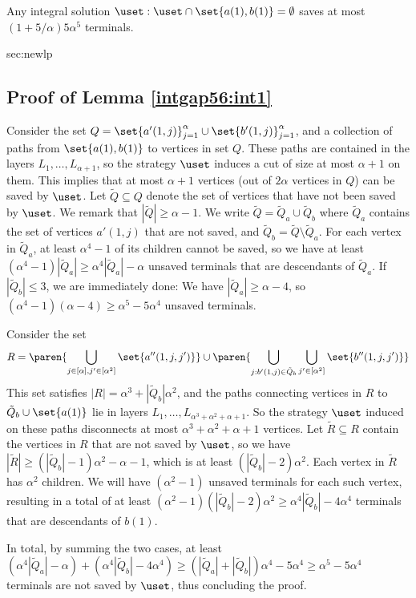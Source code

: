 \begin{lemma} 
Any integral solution $\uset: \uset \cap \set{a(1), b(1)} =\emptyset$ saves at most $(1+5/\alpha) 5 \alpha^5$ terminals.
\label{intgap56:int1}
\end{lemma} 
\begin{appendixproof}{sec:newlp}{\subsection{Proof of Lemma \ref{intgap56:int1}}}
Consider the set $Q= \set{a'(1,j)}_{j=1}^{\alpha} \cup \set{b'(1,j)}_{j=1}^{\alpha}$, and a collection of paths from $\set{a(1),b(1)}$ to vertices in set $Q$.  
These paths are contained in the layers $L_1, \ldots, L_{\alpha+1}$, so the strategy $\uset$ induces a cut of size at most $\alpha+1$ on them. 
This implies that at most $\alpha+1$ vertices (out of $2\alpha$ vertices in $Q$) can be saved by $\uset$. 
Let $\tilde Q \subseteq Q$ denote the set of vertices that have not been saved by $\uset$. We remark that $|\tilde Q| \geq \alpha - 1$.
We write $\tilde Q = \tilde Q_a \cup \tilde Q_b$ where $\tilde Q_a$ contains the set of vertices $a'(1,j)$ that are not saved, and $\tilde Q_b = \tilde Q \setminus \tilde Q_a$.  
For each vertex in $\tilde Q_a$, at least $\alpha^4 -1$ of its children cannot be saved, so we have at least $(\alpha^4 -1) |\tilde Q_a| \geq \alpha^4 |\tilde Q_a| - \alpha$ unsaved terminals that are descendants of $\tilde Q_{a}$.
If $|\tilde Q_b| \leq 3$, we are immediately done: We have $|\tilde Q_a| \geq \alpha-4$, so $(\alpha^4-1)(\alpha-4) \geq \alpha^5 - 5\alpha^4$ unsaved terminals.  
 
Consider the set 
$$R = \paren{\bigcup_{j \in [\alpha],j' \in [\alpha^2]} \set{a''(1,j,j')}} \cup \paren{\bigcup_{j: b'(1,j) \in \tilde Q_b} \bigcup_{j' \in [\alpha^2]} \set{b''(1,j,j')}}$$  
This set satisfies $|R| = \alpha^3 + |\tilde Q_b| \alpha^2$, and the paths connecting vertices in $R$ to $\tilde Q_b \cup \set{a(1)}$ lie in layers $L_1,\ldots, L_{\alpha^3 + \alpha^2 + \alpha+ 1}$.
So the strategy $\uset$ induced on these paths disconnects at most $\alpha^3+ \alpha^2 + \alpha+1$ vertices.
Let $\tilde R \subseteq R$ contain the vertices in $R$ that are not saved by $\uset$, so we have $|\tilde R| \geq (|\tilde Q_b|-1)  \alpha^2 - \alpha - 1$, which is at least $(|\tilde Q_b| - 2) \alpha^2$.  
Each vertex in  $\tilde R$ has $\alpha^2$ children. We will have $(\alpha^2-1)$ unsaved terminals for each such vertex, resulting in a total of at least $(\alpha^2 -1) (|\tilde Q_b|-2)\alpha^2 \geq \alpha^4 |\tilde Q_b| - 4 \alpha^4$ terminals that are descendants of $b(1)$.   

In total, by summing the two cases, at least $(\alpha^4 |\tilde Q_a| - \alpha) + (\alpha^4 |\tilde Q_b| - 4 \alpha^4) \geq (|\tilde Q_a| + |\tilde Q_b|)\alpha^4 - 5\alpha^4 \geq \alpha^5 - 5\alpha^4$ terminals are not saved by $\uset$, thus concluding the proof.  
\end{appendixproof} 

